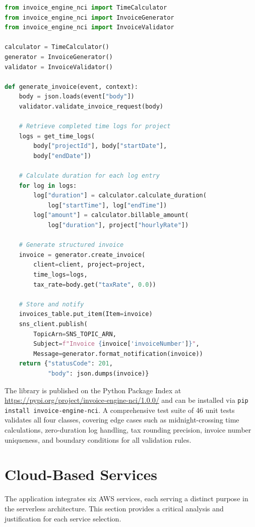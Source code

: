 \documentclass[conference]{IEEEtran}
\begin{document}
\begin{lstlisting}[language=Python, caption={Invoice generation using invoice-engine-nci library}]
from invoice_engine_nci import TimeCalculator
from invoice_engine_nci import InvoiceGenerator
from invoice_engine_nci import InvoiceValidator

calculator = TimeCalculator()
generator = InvoiceGenerator()
validator = InvoiceValidator()

def generate_invoice(event, context):
    body = json.loads(event["body"])
    validator.validate_invoice_request(body)

    # Retrieve completed time logs for project
    logs = get_time_logs(
        body["projectId"], body["startDate"],
        body["endDate"])

    # Calculate duration for each log entry
    for log in logs:
        log["duration"] = calculator.calculate_duration(
            log["startTime"], log["endTime"])
        log["amount"] = calculator.billable_amount(
            log["duration"], project["hourlyRate"])

    # Generate structured invoice
    invoice = generator.create_invoice(
        client=client, project=project,
        time_logs=logs,
        tax_rate=body.get("taxRate", 0.0))

    # Store and notify
    invoices_table.put_item(Item=invoice)
    sns_client.publish(
        TopicArn=SNS_TOPIC_ARN,
        Subject=f"Invoice {invoice['invoiceNumber']}",
        Message=generator.format_notification(invoice))
    return {"statusCode": 201,
            "body": json.dumps(invoice)}
\end{lstlisting}

The library is published on the Python Package Index at \url{https://pypi.org/project/invoice-engine-nci/1.0.0/} and can be installed via \texttt{pip install invoice-engine-nci}. A comprehensive test suite of 46 unit tests validates all four classes, covering edge cases such as midnight-crossing time calculations, zero-duration log handling, tax rounding precision, invoice number uniqueness, and boundary conditions for all validation rules.

\section{Cloud-Based Services}

The application integrates six AWS services, each serving a distinct purpose in the serverless architecture. This section provides a critical analysis and justification for each service selection.
\end{document}
